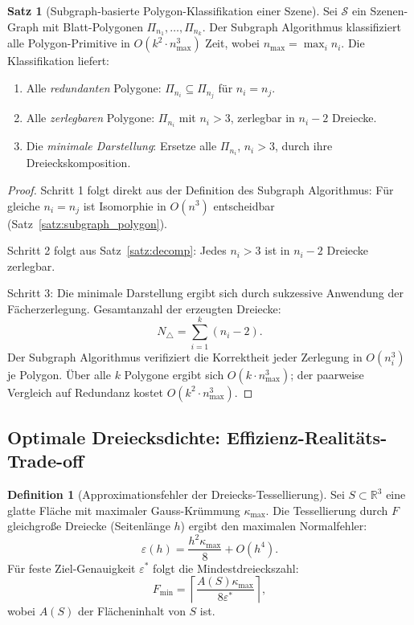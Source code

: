 ﻿\documentclass[a4paper,12pt]{article}
\theoremstyle{definition}
\newtheorem{definition}{Definition}[section]
\newtheorem{satz}{Satz}[section]
\newcommand{\R}{\mathbb{R}}
\begin{document}
\begin{satz}[Subgraph-basierte Polygon-Klassifikation einer Szene]
\label{satz:scene_class}
Sei $\mathcal{S}$ ein Szenen-Graph mit Blatt-Polygonen
$\Pi_{n_1}, \ldots, \Pi_{n_k}$. Der Subgraph Algorithmus klassifiziert
alle Polygon-Primitive in $O(k^2 \cdot n_{\max}^3)$ Zeit, wobei
$n_{\max} = \max_i n_i$. Die Klassifikation liefert:
\begin{enumerate}
	\item Alle \emph{redundanten} Polygone: $\Pi_{n_i} \subseteq \Pi_{n_j}$ f\"ur $n_i = n_j$.
	\item Alle \emph{zerlegbaren} Polygone: $\Pi_{n_i}$ mit $n_i > 3$,
	      zerlegbar in $n_i - 2$ Dreiecke.
	\item Die \emph{minimale Darstellung}: Ersetze alle $\Pi_{n_i}$, $n_i > 3$,
	      durch ihre Dreieckskomposition.
\end{enumerate}
\end{satz}

\begin{proof}
Schritt 1 folgt direkt aus der Definition des Subgraph Algorithmus:
F\"ur gleiche $n_i = n_j$ ist Isomorphie in $O(n^3)$ entscheidbar
(Satz~\ref{satz:subgraph_polygon}).

Schritt 2 folgt aus Satz~\ref{satz:decomp}: Jedes $n_i > 3$ ist in
$n_i - 2$ Dreiecke zerlegbar.

Schritt 3: Die minimale Darstellung ergibt sich durch sukzessive Anwendung
der F\"acherzerlegung. Gesamtanzahl der erzeugten Dreiecke:
\[
	N_{\triangle} = \sum_{i=1}^k (n_i - 2).
\]
Der Subgraph Algorithmus verifiziert die Korrektheit jeder Zerlegung in
$O(n_i^3)$ je Polygon. \"Uber alle $k$ Polygone ergibt sich $O(k \cdot n_{\max}^3)$;
der paarweise Vergleich auf Redundanz kostet $O(k^2 \cdot n_{\max}^3)$.
\end{proof}

\subsection{Optimale Dreiecksdichte: Effizienz-Realit\"ats-Trade-off}

\begin{definition}[Approximationsfehler der Dreiecks-Tessellierung]
Sei $S \subset \R^3$ eine glatte Fl\"ache mit maximaler Gauss-Kr\"ummung
$\kappa_{\max}$. Die Tessellierung durch $F$ gleichgro\ss{}e Dreiecke
(Seitenl\"ange $h$) ergibt den maximalen Normalfehler:
\[
	\varepsilon(h) = \frac{h^2 \kappa_{\max}}{8} + O(h^4).
\]
F\"ur feste Ziel-Genauigkeit $\varepsilon^*$ folgt die Mindestdreieckszahl:
\[
	F_{\min} = \left\lceil \frac{A(S) \kappa_{\max}}{8\varepsilon^*} \right\rceil,
\]
wobei $A(S)$ der Fl\"acheninhalt von $S$ ist.
\end{definition}
\end{document}
